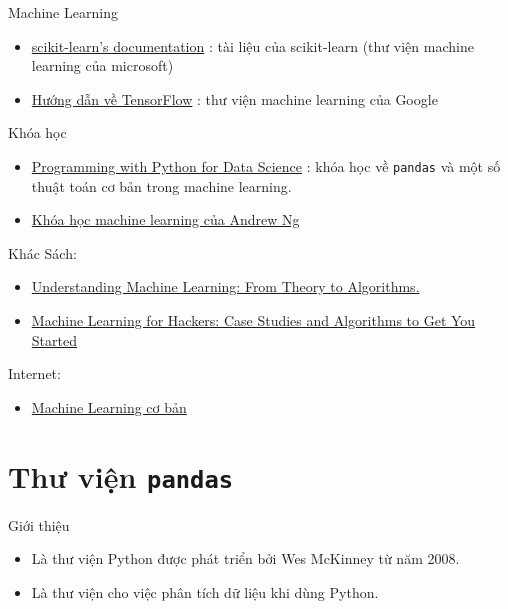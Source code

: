 \documentclass[11pt]{beamer}
\newcommand{\pandas}{\texttt{pandas}}
\begin{document}
	\begin{frame}{Machine Learning}
		\begin{itemize}
			\item \href{https://scikit-learn.org/stable/documentation.html}{scikit-learn's documentation} : tài liệu của scikit-learn (thư viện machine learning của microsoft)
			\item \href{https://www.tensorflow.org/tutorials/}{Hướng dẫn về TensorFlow} : thư viện machine learning của Google
		\end{itemize}
	\end{frame}

	\begin{frame}{Khóa học}
		\begin{itemize}
			\item \href{https://courses.edx.org/courses/course-v1:Microsoft+DAT210x+6T2016/course/}{Programming with Python for Data Science} : khóa học về \pandas{} và một số thuật toán cơ bản trong machine learning.
			\item \href{https://www.coursera.org/learn/machine-learning}{Khóa học machine learning của Andrew Ng}
		\end{itemize}
	\end{frame}

	\begin{frame}{Khác}
		Sách:
		\begin{itemize}
			\item \href{https://pdfs.semanticscholar.org/ce61/5ae61d67db8537e981a0a08da7f0f2ff1cee.pdf?_ga=2.176850727.342533066.1573446520-1563216005.1573446520}{Understanding Machine Learning: From Theory to Algorithms.}
			\item \href{https://www.amazon.com/Machine-Learning-Hackers-Studies-Algorithms/dp/1449303714}{Machine Learning for Hackers: Case Studies and Algorithms to Get You Started}
		\end{itemize}
		Internet:
		\begin{itemize}
			\item \href{https://machinelearningcoban.com/}{Machine Learning cơ bản}
		\end{itemize}
	\end{frame}

	\section{Thư viện \pandas}
		\begin{frame}{Giới thiệu}
			\begin{itemize}
				\item Là thư viện Python được phát triển bởi Wes McKinney từ năm 2008.
				\item Là thư viện cho việc phân tích dữ liệu khi dùng Python.
			\end{itemize}
		\end{frame}
		
\end{document}
